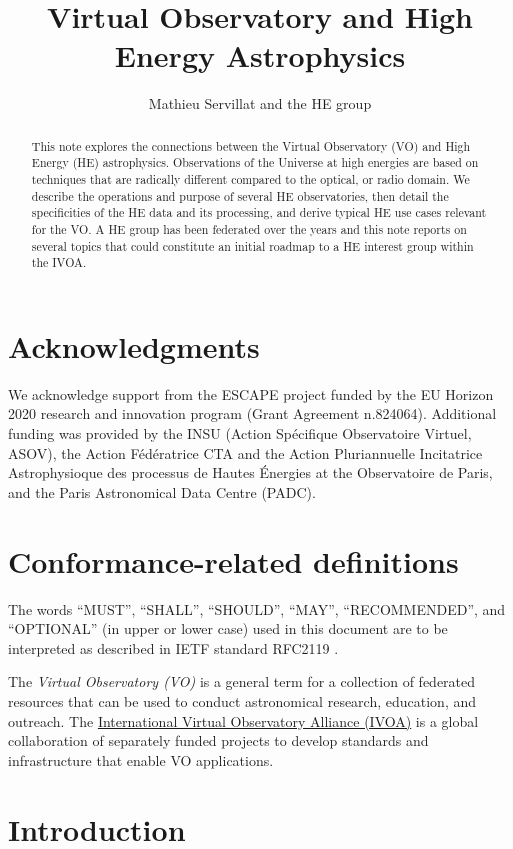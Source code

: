 \documentclass[11pt,a4paper]{ivoa}
\title{Virtual Observatory and High Energy Astrophysics}
\author{
Mathieu Servillat and the HE group
}
\begin{document}
\begin{abstract}
This note explores the connections between the Virtual Observatory (VO) and High Energy (HE) astrophysics. Observations of the Universe at high energies are based on techniques that are radically different compared to the optical, or radio domain. We describe the operations and purpose of several HE observatories, then detail the specificities of the HE data and its processing, and derive typical HE use cases relevant for the VO. A HE group has been federated over the years and this note reports on several topics that could constitute an initial roadmap to a HE interest group within the IVOA.
\end{abstract}


\section*{Acknowledgments}

We acknowledge support from the ESCAPE project funded by the EU Horizon 2020 research and innovation program (Grant Agreement n.824064).
Additional funding was provided by the INSU (Action Sp\'ecifique Observatoire Virtuel, ASOV), the Action F\'ed\'eratrice
CTA and the Action Pluriannuelle Incitatrice Astrophysioque des processus de Hautes \'Energies at the Observatoire de
Paris, and the Paris Astronomical Data Centre (PADC).

\section*{Conformance-related definitions}

The words ``MUST'', ``SHALL'', ``SHOULD'', ``MAY'', ``RECOMMENDED'', and
``OPTIONAL'' (in upper or lower case) used in this document are to be
interpreted as described in IETF standard RFC2119 \citep{std:RFC2119}.

The \emph{Virtual Observatory (VO)} is a
general term for a collection of federated resources that can be used
to conduct astronomical research, education, and outreach.
The \href{https://www.ivoa.net}{International
Virtual Observatory Alliance (IVOA)} is a global
collaboration of separately funded projects to develop standards and
infrastructure that enable VO applications.


\section{Introduction}

\end{document}
